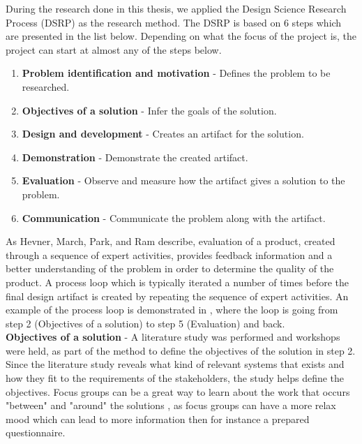During the research done in this thesis, we applied the Design Science Research 
Process (DSRP) as the research method. The DSRP is based on 6 steps which are 
presented in the list below. Depending on what the focus of the project is, 
the project can start at almost any of the steps below. \cite{peffers2006design}

\begin{enumerate}
	\item \textbf{Problem identification and motivation} - Defines the problem to be
	researched. 
	\item \textbf{Objectives of a solution} - Infer the goals of the solution.
	\item \textbf{Design and development} - Creates an artifact for the solution.
	\item \textbf{Demonstration} - Demonstrate the created artifact.
	\item \textbf{Evaluation} - Observe and measure how the artifact gives a 
	solution to the problem.
	\item \textbf{Communication} - Communicate the problem along with the artifact.
\end{enumerate}

As Hevner, March, Park, and Ram \cite{von2004design} describe, 
evaluation of a product, created through a sequence of expert activities, 
provides feedback information and a better understanding of the problem in 
order to determine the quality of the product. A process loop which is typically 
iterated a number of times before the final design artifact is created 
by repeating the sequence of expert activities. An example of the process loop 
is demonstrated in , where the loop is going 
from step 2 (Objectives of a solution) to step 5 (Evaluation) and back.\\

\textbf{Objectives of a solution} - A literature study was performed and workshops were held, as part of the 
method to define the objectives of the solution in step 2. Since the literature study 
reveals what kind of relevant systems that exists and how they fit to the
requirements of the stakeholders, the study helps define the objectives. Focus
groups can be a great way to learn about the work that occurs "between" and 
"around" the solutions \cite{FocusGroupstoStudyWorkPractice}, as focus groups
can have a more relax mood which can lead to more information then for 
instance a prepared questionnaire.\\

